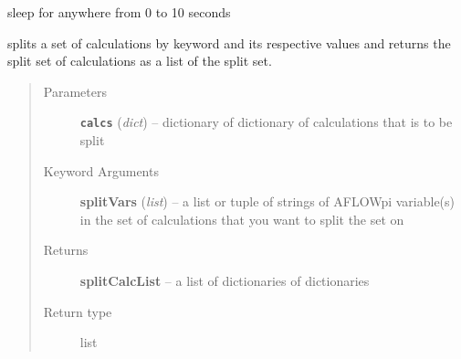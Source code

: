 \documentclass[letterpaper,10pt,english]{sphinxmanual}
\begin{document}

\begin{fulllineitems}
\label{pseudo:pseudo.__shiftGrid}
sleep for anywhere from 0 to 10 seconds

\end{fulllineitems}


\begin{fulllineitems}
\label{pseudo:pseudo.__splitCalcs}
splits a set of calculations by keyword and its respective values and
returns the split set of calculations as a list of the split set.
\begin{quote}\begin{description}
\item[{Parameters}] \leavevmode
\textbf{\texttt{calcs}} (\emph{dict}) -- dictionary of dictionary of calculations that is to be split

\item[{Keyword Arguments}] \leavevmode
\textbf{splitVars} (\emph{list}) --
a list or tuple of strings of AFLOWpi variable(s) in the
set of calculations that you want to split the set on

\item[{Returns}] \leavevmode
\textbf{splitCalcList} --
a list of dictionaries of dictionaries

\item[{Return type}] \leavevmode
list

\end{description}\end{quote}

\end{fulllineitems}


\begin{fulllineitems}
\label{pseudo:pseudo.brute_test}
\end{fulllineitems}
\end{document}
